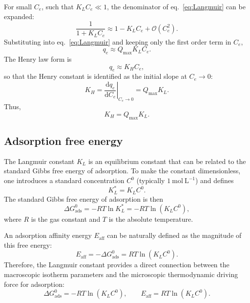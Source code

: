 \documentclass[12pt]{article}
\begin{document}
	For small \(C_e\), such that \(K_L C_e \ll 1\), the denominator of
	eq.~\eqref{eq:Langmuir} can be expanded:
	\begin{equation}
		\frac{1}{1 + K_L C_e} \approx 1 - K_L C_e + \mathcal{O}(C_e^2).
	\end{equation}
	Substituting into eq.~\eqref{eq:Langmuir} and keeping only the first order
	term in \(C_e\),
	\begin{equation}
		q_e \approx Q_{\max} K_L C_e.
	\end{equation}
	The Henry law form is
	\begin{equation}
		q_e \approx K_H C_e,
	\end{equation}
	so that the Henry constant is identified as the initial slope at
	\(C_e \to 0\):
	\begin{equation}
		K_H = \left.\frac{\mathrm{d}q_e}{\mathrm{d}C_e}\right|_{C_e \to 0}
		= Q_{\max} K_L.
	\end{equation}
	Thus,
	\begin{equation}
		\boxed{K_H = Q_{\max} K_L.}
	\end{equation}
	
	\subsection{Adsorption free energy}
	
	The Langmuir constant \(K_L\) is an equilibrium constant that can be
	related to the standard Gibbs free energy of adsorption. To make the
	constant dimensionless, one introduces a standard concentration
	\(C^0\) (typically \(1~\mathrm{mol~L^{-1}}\)) and defines
	\begin{equation}
		K_L^{\ast} = K_L C^0.
	\end{equation}
	The standard Gibbs free energy of adsorption is then
	\begin{equation}
		\Delta G_{\mathrm{ads}}^{0}
		= - R T \ln K_L^{\ast}
		= - R T \ln\left( K_L C^0 \right),
	\end{equation}
	where \(R\) is the gas constant and \(T\) is the absolute temperature.
	
	An adsorption affinity energy \(E_{\mathrm{aff}}\) can be naturally defined
	as the magnitude of this free energy:
	\begin{equation}
		E_{\mathrm{aff}} = - \Delta G_{\mathrm{ads}}^{0}
		= R T \ln\left( K_L C^0 \right).
	\end{equation}
	Therefore, the Langmuir constant provides a direct connection between
	the macroscopic isotherm parameters and the microscopic thermodynamic
	driving force for adsorption:
	\begin{equation}
		\boxed{\Delta G_{\mathrm{ads}}^{0}
			= - R T \ln\left( K_L C^0 \right),
			\qquad
			E_{\mathrm{aff}} = R T \ln\left( K_L C^0 \right).}
	\end{equation}
	
\end{document}
